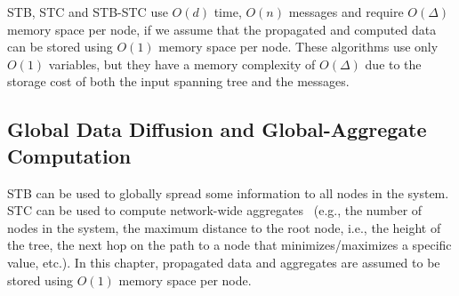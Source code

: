 STB, STC and STB-STC use $O(d)$ time, $O(n)$ messages and require $O(\Delta)$ memory space per node, if we assume that the propagated and computed data can be stored using $O(1)$ memory space per node. These algorithms use only $O(1)$ variables, but they have a memory complexity of $O(\Delta)$ due to the storage cost of both the input spanning tree and the messages.


\subsection{Global Data Diffusion and Global-Aggregate Computation}
\label{section:centrality:diffusion-aggregates}
STB can be used to globally spread some information to all nodes in the system. STC can be used to compute network-wide aggregates~\cite{lynch1996distributed,raynal2013distributed} (e.g., the number of nodes in the system, the maximum distance to the root node, i.e., the height of the tree, the next hop on the path to a node that minimizes/maximizes a specific value, etc.). In this chapter, propagated data and aggregates are assumed to be stored using $O(1)$ memory space per node.

